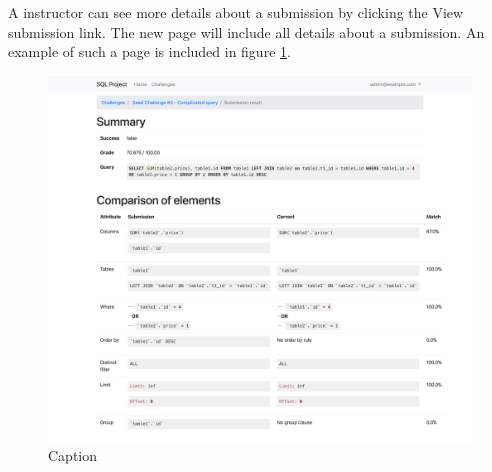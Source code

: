 A instructor can see more details about a submission by clicking the View submission link. The new page will include all details about a submission. An example of such a page is included in figure \ref{fig:app:submission_report}.

\begin{figure}
    \centering
    \includegraphics[width=\textwidth/4*3]{Appendices/submission_report.png}
    \caption{Caption}
    \label{fig:app:submission_report}
\end{figure}